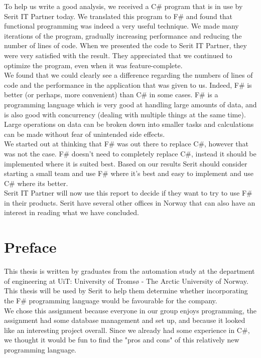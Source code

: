 \documentclass[12pt, a4paper]{article}
\begin{document}
To help us write a good analysis, we received a C\# program that is in use by Serit IT Partner today. We translated this program to F\# and found that functional programming was indeed a very useful technique. We made many iterations of the program, gradually increasing performance and reducing the number of lines of code. When we presented the code to Serit IT Partner, they were very satisfied with the result. They appreciated that we continued to optimize the program, even when it was feature-complete.\\

We found that we could clearly see a difference regarding the numbers of lines of code and the performance in the application that was given to us. Indeed, F\# is better (or perhaps, more convenient) than C\# in some cases. F\# is a programming language which is very good at handling large amounts of data, and is also good with concurrency (dealing with multiple things at the same time). Large operations on data can be broken down into smaller tasks and calculations can be made without fear of unintended side effects.\\

We started out at thinking that F\# was out there to replace C\#, however that was not the case. F\# doesn't need to completely replace C\#, instead it should be implemented where it is suited best. Based on our results Serit should consider starting a small team and use F\# where it's best and easy to implement and use C\# where its better.\\

Serit IT Partner will now use this report to decide if they want to try to use F\# in their products. Serit have several other offices in Norway that can also have an interest in reading what we have concluded.

\newpage
\section*{Preface}
This thesis is written by graduates from the automation study at the department of engineering  at UiT: University of Tromsø - The Arctic University of Norway. This thesis will be used by Serit to help them determine whether incorporating the F\# programming language would be favourable for the company.\\

We chose this assignment because everyone in our group enjoys programming, the assignment had some database management and set up, and because it looked like an interesting project overall. Since we already had some experience in C\#, we thought it would be fun to find the "pros and cons" of this relatively new programming language.\\
\end{document}
